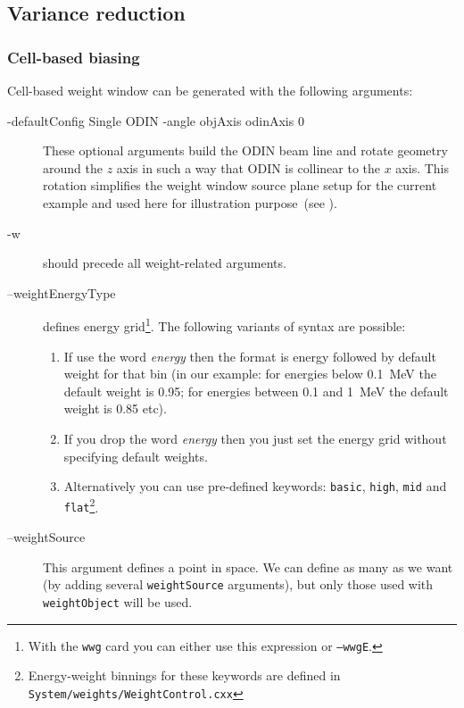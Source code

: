 \subsection{Variance reduction}
\subsubsection{Cell-based biasing}
\label{sec:vr:cell}

Cell-based weight window can be generated with the following arguments:



\begin{description}
\item[-defaultConfig Single ODIN -angle objAxis odinAxis 0] These optional arguments build the ODIN beam line
  and rotate geometry around the $z$ axis in such a way that ODIN is collinear to the $x$ axis.
  This rotation simplifies the weight window source plane setup for the current example and used here for
  illustration purpose~(see ).
\item[-w] should precede all weight-related arguments.
\item[--weightEnergyType] defines energy grid\footnote{With the {\tt wwg} card you can either use this expression or {\tt --wwgE}.}.
  The following variants of syntax are possible:
  \begin{enumerate}
    \item If use the word {\em energy} then the format is energy followed by default weight for that bin
      (in our example: for energies below \SI{0.1}{\mega\electronvolt} the default weight is \num{0.95};
          for energies between \num{0.1} and \SI{1}{\mega\electronvolt} the default weight is \num{0.85} etc).
    \item If you drop the word {\em energy} then you just set the energy grid without specifying default weights.
    \item Alternatively you can use pre-defined keywords:
      {\tt basic}, {\tt high}, {\tt mid} and {\tt flat}\footnote{Energy-weight binnings for these keywords are defined in \tt{System/weights/WeightControl.cxx}}.
    \end{enumerate}
\item[--weightSource] This argument defines a point in space. We can define as many as we want (by adding several {\tt weightSource} arguments),
  but only those used with {\tt weightObject} will be used.

\end{description}
